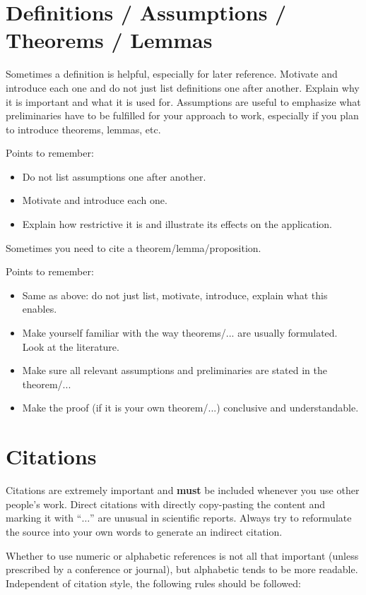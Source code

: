 \section{Definitions / Assumptions / Theorems / Lemmas}

Sometimes a definition is helpful, especially for later reference. Motivate and introduce each one and do not just list definitions one after another. Explain why it is important and what it is used for. Assumptions are useful to emphasize what preliminaries have to be fulfilled for your approach to work, especially if you plan to introduce theorems, lemmas, etc. 

Points to remember:
\begin{itemize}
	\item Do not list assumptions one after another. 
	\item Motivate and introduce each one.
	\item Explain how restrictive it is and illustrate its effects on the application.
\end{itemize}

Sometimes you need to cite a theorem/lemma/proposition. 

Points to remember:
\begin{itemize}
	\item Same as above: do not just list, motivate, introduce, explain what this enables.
	\item Make yourself familiar with the way theorems/... are usually formulated. Look at the literature. 
	\item Make sure all relevant assumptions and preliminaries are stated in the theorem/...
	\item Make the proof (if it is your own theorem/...) conclusive and understandable.
\end{itemize}



\section{Citations}

Citations are extremely important and \textbf{must} be included whenever you use other people's work. Direct citations with directly copy-pasting the content and marking it with ``$\ldots$'' are unusual in scientific reports. Always try to reformulate the source into your own words to generate an indirect citation. 


Whether to use numeric or alphabetic references is not all that important (unless prescribed by a conference or journal), but alphabetic tends to be more readable. Independent of citation style, the following rules should be followed:

